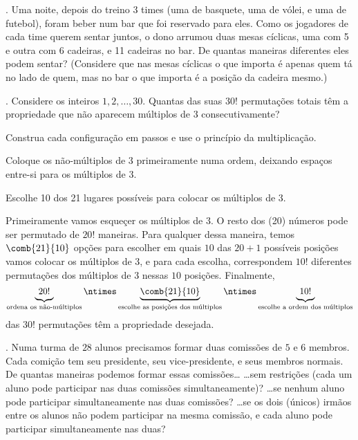 \endproblem

\problem.
Uma noite, depois do treino 3 times (uma de basquete, uma de vólei, e uma de
futebol), foram beber num bar que foi reservado para eles.
Como os jogadores de cada time querem sentar juntos,
o dono arrumou duas mesas cíclicas, uma com 5 e outra com 6 cadeiras, e 11 cadeiras no bar.
\endgraf
De quantas maneiras diferentes eles podem sentar?
(Considere que nas mesas cíclicas o que importa é apenas quem tá no lado de quem, mas no bar o que importa é a posição da cadeira mesmo.)

\endproblem

\problem.
Considere os inteiros $1,2,\dotsc, 30$.
Quantas das suas $30!$ permutações totais têm a propriedade que
não aparecem múltiplos de $3$ consecutivamente?

\hint
Construa cada configuração em passos e use o princípio da multiplicação.

\hint
Coloque os não-múltiplos de 3 primeiramente numa ordem, deixando espaços entre-si
para os múltiplos de 3.

\hint
Escolhe 10 dos 21 lugares possíveis para colocar os múltiplos de 3.

\solution
Primeiramente vamos esqueçer os múltiplos de 3.
O resto dos (20) números pode ser permutado de
$20!$ maneiras.
Para qualquer dessa maneira, temos $\comb {21} {10}$
opções para escolher em quais $10$ das $20+1$ possíveis posições vamos colocar os múltiplos de 3,
e para cada escolha, correspondem $10!$ diferentes permutações dos múltiplos de 3 nessas $10$ posições.
Finalmente,
$$
\underbrace{\phantom(20!\phantom)}_{\text{ordena os não-múltiplos}}\ntimes \underbrace{\comb {21} {10}}_{\text{escolhe as posições dos múltiplos}}\ntimes \underbrace{\phantom(10!\phantom)}_{\text{escolhe a ordem dos múltiplos}}
$$
das $30!$ permutações têm a propriedade desejada.

\endproblem

\problem.
Numa turma de $28$ alunos
precisamos formar duas comissões de $5$ e $6$ membros.
Cada comição tem seu presidente, seu vice-presidente, e seus membros normais.
De quantas maneiras podemos formar essas comissões\dots
\beginol
\li\dots sem restrições (cada um aluno pode participar nas duas comissões simultaneamente)?
\li\dots se nenhum aluno pode participar simultaneamente nas duas comissões?
\li\dots se os dois (únicos) irmãos entre os alunos não podem participar na mesma comissão,
e cada aluno pode participar simultaneamente nas duas?
\endol

\endproblem

